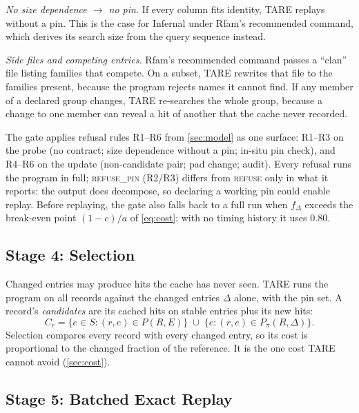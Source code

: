 \documentclass[letterpaper,twocolumn,10pt]{article}
\theoremstyle{definition}
\newcommand{\sys}{TARE\xspace}
\newcommand{\sys}{PARE\xspace}
\newcommand{\dec}[1]{\textsc{#1}}
\begin{document}
\textit{No size dependence $\rightarrow$ no pin.} If every column fits identity, \sys replays without a pin. This is the
case for Infernal under Rfam's recommended command, which derives its search size from the query sequence instead.

\textit{Side files and competing entries.} Rfam's recommended command passes a ``clan'' file listing families that
compete. On a subset, \sys rewrites that file to the families present, because the program rejects names it cannot
find. If any member of a declared group changes, \sys re\nobreakdash-searches the whole group, because a change to one member
can reveal a hit of another that the cache never recorded.

The gate applies refusal rules R1--R6 from \cref{sec:model} as one surface: R1--R3 on the probe (no contract; size
dependence without a pin; in\nobreakdash-situ pin check), and R4--R6 on the update (non\nobreakdash-candidate pair; pad change; audit).
Every refusal runs the program in full; \dec{refuse\_pin} (R2/R3) differs from \dec{refuse} only in what it reports: the
output does decompose, so declaring a working pin could enable replay. Before replaying, the gate also falls back to a
full run when $f_\Delta$ exceeds the break\nobreakdash-even point $(1-c)/a$ of \cref{eq:cost}; with no timing history it uses 0.80.

\subsection{Stage 4: Selection}

Changed entries may produce hits the cache has never seen. \sys runs the program on all records against the changed
entries $\Delta$ alone, with the pin set. A record's \textit{candidates} are its cached hits on stable entries plus its
new hits:
\begin{equation}
C_r = \{e \in S : (r,e) \in P(R,E)\} \;\cup\; \{e : (r,e) \in P_\pi(R,\Delta)\}.
\label{eq:cand}
\end{equation}
Selection compares every record with every changed entry, so its cost is proportional to the changed fraction of the
reference. It is the one cost \sys cannot avoid (\cref{sec:cost}).

\subsection{Stage 5: Batched Exact Replay}
\label{sec:replay}
\end{document}
